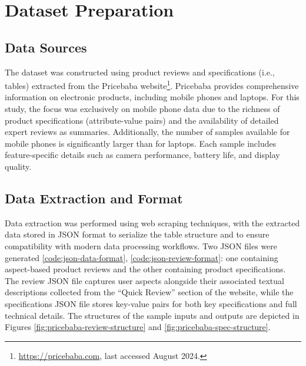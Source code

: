 \section{Dataset Preparation}
\subsection{Data Sources}
The dataset was constructed using product reviews and specifications (i.e., tables) extracted from the Pricebaba website\footnote{\url{https://pricebaba.com}, last accessed August 2024.}. Pricebaba provides comprehensive information on electronic products, including mobile phones and laptops. For this study, the focus was exclusively on mobile phone data due to the richness of product specifications (attribute-value pairs) and the availability of detailed expert reviews as summaries. Additionally, the number of samples available for mobile phones is significantly larger than for laptops. Each sample includes feature-specific details such as camera performance, battery life, and display quality.

\subsection{Data Extraction and Format}
Data extraction was performed using web scraping techniques, with the extracted data stored in JSON format to serialize the table structure and to ensure compatibility with modern data processing workflows. Two JSON files were generated \ref{code:json-data-format}, \ref{code:json-review-format}: one containing aspect-based product reviews and the other containing product specifications. The review JSON file captures user aspects alongside their associated textual descriptions collected from the ``Quick Review'' section of the website, while the specifications JSON file stores key-value pairs for both key specifications and full technical details. The structures of the sample inputs and outputs are depicted in Figures \ref{fig:pricebaba-review-structure} and \ref{fig:pricebaba-spec-structure}.

